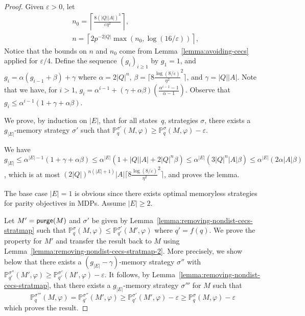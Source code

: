 \documentclass[a4paper,USenglish,cleveref, autoref, thm-restate]{lipics-v2021}
\let\epsilon\varepsilon
\def\abs#1{\ensuremath{\lvert #1 \rvert}}
\newcommand*{\pr}{\mathbb{P}}
\def\Act{A}
\newcommand\purge[1]{\textrm{\sf purge}(#1)}
\begin{document}
\begin{proof}
  Given $\epsilon>0$, let    
  \begin{align*}
    &n_0=\left\lceil \frac{8(\abs{Q}\abs{\Act})^3}{\epsilon\eta^2}\right\rceil,\\
    &n = \left\lceil 2p^{-2\abs{Q}}\max(n_0, \log(16/\epsilon))\right\rceil,
  \end{align*}
  Notice that the bounds on $n$ and $n_0$ come from Lemma~\ref{lemma:avoiding-cecs} applied for $\epsilon/4$.
  Define the sequence $(g_i)_{i\geq 1}$ by $g_1 = 1$, and
  $g_i = \alpha(g_{i-1} + \beta) + \gamma$
  where $\alpha=2\abs{Q}^n$, $\beta=\lceil 8\frac{\log(8/\epsilon)}{\eta^2}^2\rceil$, and $\gamma = \abs{Q}\abs{A}$.
  Note that we have, for $i>1$, 
  $g_i = \alpha^{i-1} + (\gamma + \alpha\beta)(\frac{\alpha^{i-1}-1}{\alpha-1})$.  
  Observe that $g_i \leq \alpha^{i-1}(1+\gamma+\alpha\beta)$.

  We prove, by induction on $\abs{E}$, that for all states~$q$, strategies $\sigma$, 
  there exists a $g_{\abs{E}}$-memory strategy $\sigma'$ such that $\pr_q^{\sigma'}(M, \varphi) \geq \pr_q^{\sigma}(M, \varphi) - \epsilon$.
  
  We have $g_{\abs{E}} \leq \alpha^{\abs{E}-1}(1+\gamma+\alpha\beta) \leq \alpha^{\abs{E}}(1 + \abs{Q}\abs{A} + 2\abs{Q}^n\beta)\leq
  \alpha^{\abs{E}}(3\abs{Q}^n\abs{\Act}\beta) \leq \alpha^{\abs{E}}(2\alpha\abs{\Act}\beta) $, which is at most
  $(2\abs{Q})^{n(\abs{E}+1)}\abs{\Act}\lceil 8\frac{\log(8/\epsilon)}{\eta^2}^2\rceil$, and proves the lemma.
  
  The base case $\abs{E}=1$ is obvious since there exists optimal memoryless strategies for parity objectives
  in MDPs. Assume $\abs{E}\geq 2$.

  Let $M'=\purge{M}$ and $\sigma'$ be given by Lemma~\ref{lemma:removing-nondist-cecs-stratmap} such that 
  $\pr_{q}^\sigma(M,\varphi) \leq \pr_{q'}^{\sigma'}(M',\varphi)$ where $q' = f(q)$.
  We prove the property for $M'$ and transfer the result back to $M$ using Lemma~\ref{lemma:removing-nondist-cecs-stratmap-2}.
  More precisely, we show below that there exists a $(g_{\abs{E}}-\gamma)$-memory strategy $\sigma''$ with 
  $\pr_{q'}^{\sigma''}(M',\varphi) \geq \pr_{q'}^{\sigma'}(M',\varphi) - \epsilon$.
  It follows, by Lemma~\ref{lemma:removing-nondist-cecs-stratmap}, that there exists a $g_{\abs{E}}$-memory strategy $\sigma'''$
  for $M$  such that 
  \[
    \pr_{q}^{\sigma'''}(M,\varphi) = \pr_{q'}^{\sigma''}(M',\varphi) \geq \pr_{q'}^{\sigma'}(M',\varphi)-\epsilon \geq \pr_{q}^\sigma(M,\varphi)-\epsilon 
  \]
  which proves the result.


\end{proof}
\end{document}
